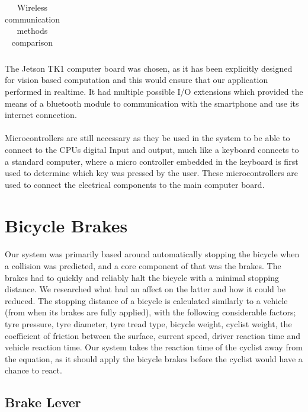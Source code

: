\documentclass[a4paper]{report}
\begin{document}
{\begin{table}[h]
\begin{tabular}{ | m{3cm} | m{2cm} | m{3cm} | m{3cm} | m{3.5cm} | m{1cm} |}
    \end{tabular}

\caption[Table caption text]{Wireless communication methods comparison} 
\label{table:board_comp}
\end{table}

\endlandscape

The Jetson TK1 computer board was chosen, as it has been explicitly designed for vision based computation and this would ensure that our application performed in realtime. It had multiple possible I/O extensions which provided the means of a bluetooth module to communication with the smartphone and use its internet connection. 

\paragraph{}Microcontrollers are still necessary as they be used in the system to be able to connect to the CPUs digital Input and output, much like a keyboard connects to a standard computer, where a micro controller embedded in the keyboard is first used to determine which key was pressed by the user. These microcontrollers are used to connect the electrical components to the main computer board. 

\section{Bicycle Brakes}

\paragraph{}Our system was primarily based around automatically stopping the bicycle when a collision was predicted, and a core component of that was the brakes. The brakes had to quickly and reliably halt the bicycle with a minimal stopping distance. We researched what had an affect on the latter and how it could be reduced. The stopping distance of a bicycle is calculated similarly to a vehicle (from when its brakes are fully applied), with the following considerable factors; tyre pressure, tyre diameter, tyre tread type, bicycle weight, cyclist weight, the coefficient of friction between the surface, current speed, driver reaction time and vehicle reaction time. Our system takes the reaction time of the cyclist away from the equation, as it should apply the bicycle brakes before the cyclist would have a chance to react. 

\subsection{Brake Lever}
\label{sec:brake_lever}

}
\end{document}
